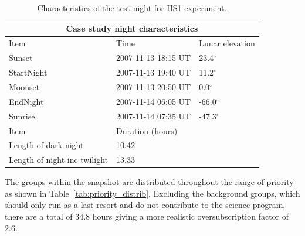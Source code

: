 \begin{table}[htbp]
\begin{center}
\begin{tabular}{lll}
\toprule
\multicolumn{3}{c}{Case study night characteristics} \\
\midrule
Item       &  Time               & Lunar elevation \\
\midrule
Sunset     & 2007-11-13 18:15 UT & 23.4$^{\circ}$\\
StartNight & 2007-11-13 19:40 UT & 11.2$^{\circ}$\\
Moonset    & 2007-11-13 20:50 UT & 0.0$^{\circ}$\\
EndNight   & 2007-11-14 06:05 UT & -66.0$^{\circ}$\\
Sunrise    & 2007-11-14 07:35 UT & -47.3$^{\circ}$\\
\midrule
Item                         & Duration (hours) \\
\midrule
Length of dark night         & 10.42\\
Length of night inc twilight & 13.33\\
\bottomrule
\end{tabular}
\caption[Characteristics of test night for HS1 experiment]{Characteristics of the test night for HS1 experiment.}
\label{tab:mam_nights}
\end{center}
\end{table}


The groups within the snapshot are distributed throughout the range of priority as shown in Table~\ref{tab:priority_distrib}. Excluding the background groups, which should only run as a last resort and do not contribute to the science program, there are a total of 34.8 hours giving a more realistic oversubscription factor of 2.6.

